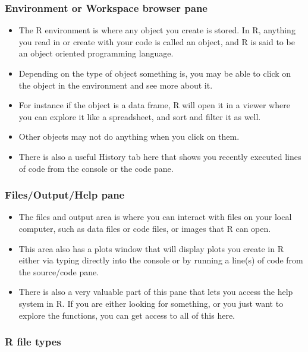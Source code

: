 \documentclass[
]{article}
\begin{document}
\hypertarget{environment-or-workspace-browser-pane}{%
\subsubsection{Environment or Workspace browser pane}\label{environment-or-workspace-browser-pane}}

\begin{itemize}
\item
  The R environment is where any object you create is stored. In R, anything you read in or create with your code is called an object, and R is said to be an object oriented programming language.
\item
  Depending on the type of object something is, you may be able to click on the object in the environment and see more about it.
\item
  For instance if the object is a data frame, R will open it in a viewer where you can explore it like a spreadsheet, and sort and filter it as well.
\item
  Other objects may not do anything when you click on them.
\item
  There is also a useful History tab here that shows you recently executed lines of code from the console or the code pane.
\end{itemize}

\hypertarget{filesoutputhelp-pane}{%
\subsubsection{Files/Output/Help pane}\label{filesoutputhelp-pane}}

\begin{itemize}
\item
  The files and output area is where you can interact with files on your local computer, such as data files or code files, or images that R can open.
\item
  This area also has a plots window that will display plots you create in R either via typing directly into the console or by running a line(s) of code from the source/code pane.
\item
  There is also a very valuable part of this pane that lets you access the help system in R. If you are either looking for something, or you just want to explore the functions, you can get access to all of this here.
\end{itemize}

\hypertarget{r-file-types}{%
\subsubsection{R file types}\label{r-file-types}}
\end{document}
